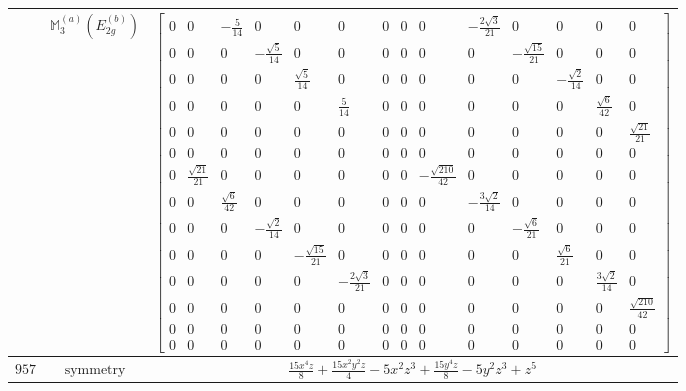 \documentclass[fleqn,8pt,landscape]{jsarticle}
\begin{document}
\begin{longtable}{ccc}
$  $ & $ \mathbb{M}_{3}^{(a)}(E_{2g}^{(b)}) $ & $ \begin{bmatrix} 0 & 0 & - \frac{5}{14} & 0 & 0 & 0 & 0 & 0 & 0 & - \frac{2 \sqrt{3}}{21} & 0 & 0 & 0 & 0 \\ 0 & 0 & 0 & - \frac{\sqrt{5}}{14} & 0 & 0 & 0 & 0 & 0 & 0 & - \frac{\sqrt{15}}{21} & 0 & 0 & 0 \\ 0 & 0 & 0 & 0 & \frac{\sqrt{5}}{14} & 0 & 0 & 0 & 0 & 0 & 0 & - \frac{\sqrt{2}}{14} & 0 & 0 \\ 0 & 0 & 0 & 0 & 0 & \frac{5}{14} & 0 & 0 & 0 & 0 & 0 & 0 & \frac{\sqrt{6}}{42} & 0 \\ 0 & 0 & 0 & 0 & 0 & 0 & 0 & 0 & 0 & 0 & 0 & 0 & 0 & \frac{\sqrt{21}}{21} \\ 0 & 0 & 0 & 0 & 0 & 0 & 0 & 0 & 0 & 0 & 0 & 0 & 0 & 0 \\ 0 & \frac{\sqrt{21}}{21} & 0 & 0 & 0 & 0 & 0 & 0 & - \frac{\sqrt{210}}{42} & 0 & 0 & 0 & 0 & 0 \\ 0 & 0 & \frac{\sqrt{6}}{42} & 0 & 0 & 0 & 0 & 0 & 0 & - \frac{3 \sqrt{2}}{14} & 0 & 0 & 0 & 0 \\ 0 & 0 & 0 & - \frac{\sqrt{2}}{14} & 0 & 0 & 0 & 0 & 0 & 0 & - \frac{\sqrt{6}}{21} & 0 & 0 & 0 \\ 0 & 0 & 0 & 0 & - \frac{\sqrt{15}}{21} & 0 & 0 & 0 & 0 & 0 & 0 & \frac{\sqrt{6}}{21} & 0 & 0 \\ 0 & 0 & 0 & 0 & 0 & - \frac{2 \sqrt{3}}{21} & 0 & 0 & 0 & 0 & 0 & 0 & \frac{3 \sqrt{2}}{14} & 0 \\ 0 & 0 & 0 & 0 & 0 & 0 & 0 & 0 & 0 & 0 & 0 & 0 & 0 & \frac{\sqrt{210}}{42} \\ 0 & 0 & 0 & 0 & 0 & 0 & 0 & 0 & 0 & 0 & 0 & 0 & 0 & 0 \\ 0 & 0 & 0 & 0 & 0 & 0 & 0 & 0 & 0 & 0 & 0 & 0 & 0 & 0 \end{bmatrix} $ \\ \hline
$ 957 $ & $ \text{symmetry} $ & $ \frac{15 x^{4} z}{8} + \frac{15 x^{2} y^{2} z}{4} - 5 x^{2} z^{3} + \frac{15 y^{4} z}{8} - 5 y^{2} z^{3} + z^{5} $ \\

\end{longtable}
\end{document}
